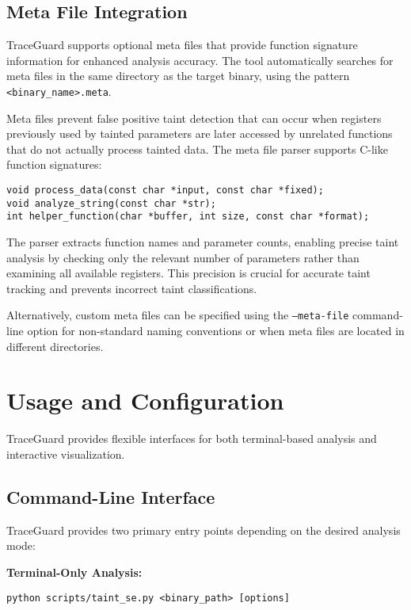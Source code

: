 \subsection{Meta File Integration}

TraceGuard supports optional meta files that provide function signature information for enhanced analysis accuracy. The tool automatically searches for meta files in the same directory as the target binary, using the pattern \texttt{<binary\_name>.meta}.

Meta files prevent false positive taint detection that can occur when registers previously used by tainted parameters are later accessed by unrelated functions that do not actually process tainted data. The meta file parser supports C-like function signatures:

\begin{verbatim}
void process_data(const char *input, const char *fixed);
void analyze_string(const char *str);
int helper_function(char *buffer, int size, const char *format);
\end{verbatim}

The parser extracts function names and parameter counts, enabling precise taint analysis by checking only the relevant number of parameters rather than examining all available registers. This precision is crucial for accurate taint tracking and prevents incorrect taint classifications.

Alternatively, custom meta files can be specified using the \texttt{--meta-file} command-line option for non-standard naming conventions or when meta files are located in different directories.

\section{Usage and Configuration}\label{sec:usage_configuration}

TraceGuard provides flexible interfaces for both terminal-based analysis and interactive visualization.

\subsection{Command-Line Interface}

TraceGuard provides two primary entry points depending on the desired analysis mode:

\textbf{Terminal-Only Analysis:}
\begin{verbatim}
python scripts/taint_se.py <binary_path> [options]
\end{verbatim}

